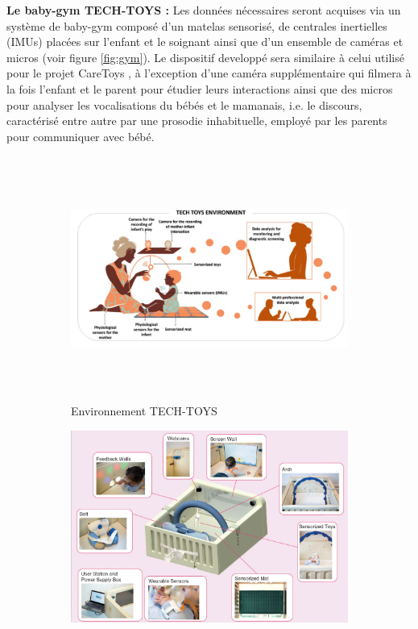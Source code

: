 \documentclass[8pt]{article}
\begin{document}
\textbf{Le baby-gym TECH-TOYS :} Les données nécessaires seront acquises via un système de baby-gym
composé d’un matelas sensorisé, de centrales inertielles (IMUs) placées sur l’enfant et le soignant ainsi que d’un ensemble de caméras et micros (voir figure \ref{fig:gym}). Le dispositif developpé sera similaire à celui utilisé pour le projet CareToys , à l’exception d’une caméra supplémentaire qui filmera à la fois l’enfant et le parent pour étudier leurs interactions ainsi que des micros pour analyser les vocalisations du bébés et le mamanais, i.e. le discours, caractérisé entre autre par une prosodie inhabituelle, employé par les parents pour communiquer avec bébé.
\begin{figure}[H]
    \begin{subfigure}{1\textwidth}
        \centering
        \includegraphics[width=\linewidth, height=8cm]{../TT env.jpg}
        \caption{Environnement TECH-TOYS}
        \label{subfig:gyma}
    \end{subfigure}
    \begin{subfigure}{1\textwidth}
    \centering
        \includegraphics{../babygym.jpg}

\end{subfigure}
\end{figure}
\end{document}

